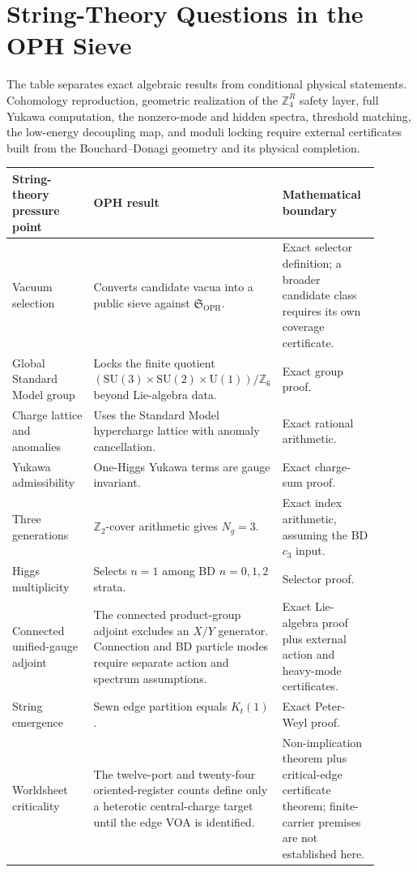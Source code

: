 \documentclass[11pt]{article}
\theoremstyle{remark}
\theoremstyle{plain}
\newcommand{\OPH}{\mathrm{OPH}}
\newcommand{\SU}{\mathrm{SU}}
\newcommand{\U}{\mathrm{U}}
\newcommand{\Z}{\mathbb Z}
\newcommand{\ZfourR}{\mathbb Z_4^R}
\begin{document}
\section{String-Theory Questions in the OPH Sieve}

The table separates exact algebraic results from conditional physical statements.
Cohomology reproduction, geometric realization of the \(\ZfourR\) safety layer, full Yukawa
computation, the nonzero-mode and hidden spectra, threshold matching, the low-energy decoupling
map, and moduli locking require external certificates built from the Bouchard--Donagi geometry
and its physical completion.

\begin{longtable}{L{0.26\linewidth}L{0.34\linewidth}L{0.30\linewidth}}
\toprule
\textbf{String-theory pressure point} & \textbf{OPH result} & \textbf{Mathematical boundary} \\
\midrule
Vacuum selection & Converts candidate vacua into a public sieve against
\(\mathfrak S_{\OPH}\). & Exact selector definition; a broader candidate class requires its own coverage certificate. \\
Global Standard Model group & Locks the finite quotient
\((\SU(3)\times\SU(2)\times\U(1))/\Z_6\) beyond Lie-algebra data. & Exact group proof. \\
Charge lattice and anomalies & Uses the Standard Model hypercharge lattice with anomaly
cancellation. & Exact rational arithmetic. \\
Yukawa admissibility & One-Higgs Yukawa terms are gauge invariant. & Exact charge-sum proof. \\
Three generations & \(\Z_2\)-cover arithmetic gives \(N_g=3\). & Exact index arithmetic,
assuming the BD \(c_3\) input. \\
Higgs multiplicity & Selects \(n=1\) among BD \(n=0,1,2\) strata. & Selector proof. \\
Connected unified-gauge adjoint & The connected product-group adjoint excludes an
\(X/Y\) generator. Connection and BD particle modes require separate action and spectrum assumptions. & Exact
Lie-algebra proof plus external action and heavy-mode certificates. \\
String emergence & Sewn edge partition equals \(K_t(1)\). & Exact Peter-Weyl proof. \\
Worldsheet criticality & The twelve-port and twenty-four oriented-register counts define only a
heterotic central-charge target until the edge VOA is identified. & Non-implication theorem plus
critical-edge certificate theorem; finite-carrier premises are not established here. \\

\end{longtable}
\end{document}
